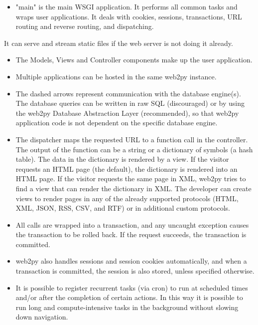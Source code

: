 \documentclass[justified,sixbynine,notoc]{tufte-book}
\begin{document}
\begin{fullwidth}
\begin{itemize}
\item "main" is the main WSGI application. It performs all common tasks and wraps user applications. It deals with cookies, sessions, transactions, URL routing and reverse routing, and dispatching.
\end{itemize}
It can serve and stream static files if the web server is not doing it already.
\begin{itemize}
\item The Models, Views and Controller components make up the user application.

\item Multiple applications can be hosted in the same web2py instance.

\item The dashed arrows represent communication with the database engine(s). The database queries can be written in raw SQL (discouraged) or by using the web2py Database Abstraction Layer (recommended), so that web2py application code is not dependent on the specific database engine.

\item The dispatcher maps the requested URL to a function call in the controller. The output of the function can be a string or a dictionary of symbols (a hash table). The data in the dictionary is rendered by a view. If the visitor requests an HTML page (the default), the dictionary is rendered into an HTML page. If the visitor requests the same page in XML, web2py tries to find a view that can render the dictionary in XML. The developer can create views to render pages in any of the already supported protocols (HTML, XML, JSON, RSS, CSV, and RTF) or in additional custom protocols.

\item All calls are wrapped into a transaction, and any uncaught exception causes the transaction to be rolled back. If the request succeeds, the transaction is committed.

\item web2py also handles sessions and session cookies automatically, and when a transaction is committed, the session is also stored, unless specified otherwise.

\item It is possible to register recurrent tasks (via cron) to run at scheduled times and/or after the completion of certain actions. In this way it is possible to run long and compute-intensive tasks in the background without slowing down navigation.
\end{itemize}


\end{fullwidth}
\end{document}
